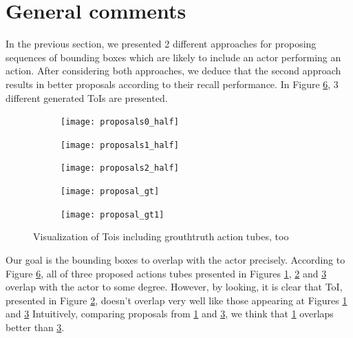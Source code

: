 \section{General comments}

In the previous section, we presented 2 different approaches for proposing sequences of bounding boxes which are likely to include an
actor performing an action. After considering both approaches, we deduce that the second approach results in better proposals
according to their recall performance. In Figure \ref{fig:proposals}, 3 different generated ToIs are presented.

\begin{figure}[h]
  \begin{subfigure}{1\textwidth}
    \centering
    \texttt{[image: proposals0\_half]}
    \caption{}
    \label{fig:proposals0}
  \end{subfigure}

  \begin{subfigure}{1\textwidth}
    \centering
    \texttt{[image: proposals1\_half]}
    \caption{}
    \label{fig:proposals1}
  \end{subfigure}

  \begin{subfigure}{1\textwidth}
    \centering
    \texttt{[image: proposals2\_half]}
    \caption{}
    \label{fig:proposals2}
  \end{subfigure}

  \begin{subfigure}{1\textwidth}
    \centering
    \texttt{[image: proposal\_gt]}
    \caption{}
    \label{fig:proposals_gt0}
  \end{subfigure}

  \begin{subfigure}{1\textwidth}
    \centering
    \texttt{[image: proposal\_gt1]}
    \caption{}
    \label{fig:proposals_gt1}
  \end{subfigure}
  \centering
  \caption{ Visualization of Tois including grouthtruth action tubes, too }


  \label{fig:proposals}
\end{figure}

Our goal is  the bounding boxes to overlap with the actor precisely. According to Figure \ref{fig:proposals}, all of three proposed actions tubes
presented in Figures \ref{fig:proposals0}, \ref{fig:proposals1} and \ref{fig:proposals2} overlap with the actor to some degree.
However, by looking, it is clear that ToI, presented in Figure \ref{fig:proposals1}, doesn't overlap very well like those appearing at Figures \ref{fig:proposals0} and \ref{fig:proposals2}
Intuitively, comparing proposals from \ref{fig:proposals0} and \ref{fig:proposals2}, we think that \ref{fig:proposals0} overlaps better than \ref{fig:proposals2}.

